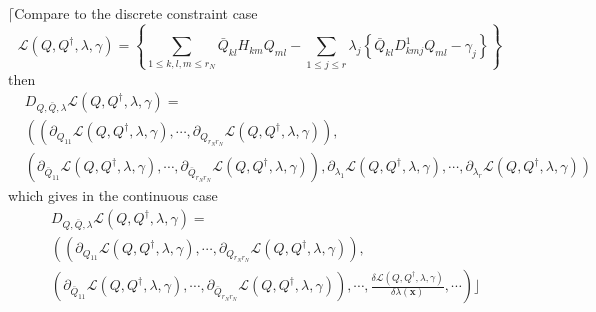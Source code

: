 \documentclass[aps,preprint]{revtex4}%
\begin{document}
$\lceil$Compare to the discrete constraint case
\begin{equation}
\mathcal{L}\left(  Q,Q^{\dagger},\lambda,\gamma\right)  =\left\{  \sum_{1\leq
k,l,m\leq r_{N}}\bar{Q}_{kl}H_{km}Q_{ml}-\sum_{1\leq j\leq r}\lambda
_{j}\left\{  \bar{Q}_{kl}D_{kmj}^{1}Q_{ml}-\gamma_{j}\right\}  \right\}
\end{equation}
then
\begin{align}
&  D_{Q,\bar{Q},\lambda}\mathcal{L}\left(  Q,Q^{\dagger},\lambda
,\gamma\right)  =\nonumber\\
&  \left(  \left(  \partial_{Q_{11}}\mathcal{L}\left(  Q,Q^{\dagger}%
,\lambda,\gamma\right)  ,\cdots,\partial_{Q_{r_{N}r_{N}}}\mathcal{L}\left(
Q,Q^{\dagger},\lambda,\gamma\right)  \right)  ,\right. \nonumber\\
&  \left(  \partial_{\bar{Q}_{11}}\mathcal{L}\left(  Q,Q^{\dagger}%
,\lambda,\gamma\right)  ,\cdots,\partial_{\bar{Q}_{r_{N}r_{N}}}\mathcal{L}%
\left(  Q,Q^{\dagger},\lambda,\gamma\right)  \right)  ,\left.  \partial
_{\lambda_{1}}\mathcal{L}\left(  Q,Q^{\dagger},\lambda,\gamma\right)
,\cdots,\partial_{\lambda_{r}}\mathcal{L}\left(  Q,Q^{\dagger},\lambda
,\gamma\right)  \right)
\end{align}
which gives in the continuous case
\begin{align}
&  D_{Q,\bar{Q},\lambda}\mathcal{L}\left(  Q,Q^{\dagger},\lambda
,\gamma\right)  =\nonumber\\
&  \left(  \left(  \partial_{Q_{11}}\mathcal{L}\left(  Q,Q^{\dagger}%
,\lambda,\gamma\right)  ,\cdots,\partial_{Q_{r_{N}r_{N}}}\mathcal{L}\left(
Q,Q^{\dagger},\lambda,\gamma\right)  \right)  \right.  ,\nonumber\\
&  \left(  \partial_{\bar{Q}_{11}}\mathcal{L}\left(  Q,Q^{\dagger}%
,\lambda,\gamma\right)  ,\cdots,\partial_{\bar{Q}_{r_{N}r_{N}}}\mathcal{L}%
\left(  Q,Q^{\dagger},\lambda,\gamma\right)  \right)  ,\left.  \cdots
,\frac{\delta\mathcal{L}\left(  Q,Q^{\dagger},\lambda,\gamma\right)  }%
{\delta\lambda\left(  \mathbf{x}\right)  },\cdots\right)  \rfloor
\end{align}
\end{document}
